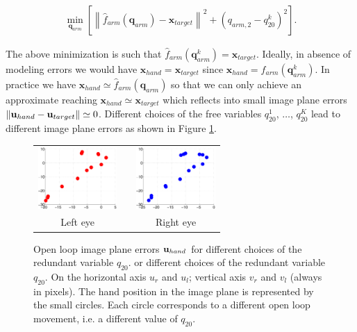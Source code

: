 {\footnotesize 
  \begin{eqnarray} \label{Eq:OpenLoopMovements}
	\min_{\mathbf q_{arm}}
	\left[
	  \left\| \hat f_{arm}(\mathbf q_{arm}) - \mathbf x_{target}\right\|^2 + \left(q_{arm,2}-q_{20}^k\right)^2
	  \right].
  \end{eqnarray}
}

 The above minimization is such that $\hat f_{arm}(\mathbf q_{arm}^k) = \mathbf x_{target}$. Ideally, in absence
 of modeling errors we would have $ \mathbf x_{hand} = \mathbf x_{target}$ since $\mathbf x_{hand} = f_{arm}(\mathbf q_{arm}^k)$. In practice we have $\mathbf x_{hand} \simeq \hat f_{arm}(\mathbf q_{arm})$ 
 so that we can only achieve an approximate reaching $ \mathbf x_{hand} \simeq \mathbf x_{target}$ 
 which reflects into small image plane errors $\| \mathbf{u}_{hand} - \mathbf{u}_{target}\| \simeq 0$. Different choices 
 of the free variables $q_{20}^1$, $\dots$, $q_{20}^K$ lead to different image plane errors as shown 
 in Figure \ref{Fig:ImagePlaneOpenLoopErrors}.



\begin{figure}
  \begin{center}
	\begin{tabular}{ccc}
	  \parbox{30mm}{\includegraphics[width=30mm]{Figure/LeftEyeOpenLoop.eps}}  & \hspace{0.1cm} &
	  \parbox{30mm}{\includegraphics[width=30mm]{Figure/RightEyeOpenLoop.eps}}
	  \\
	  \parbox{30mm}{\centering Left eye } & \hspace{0.1cm} & \parbox{30mm}{\centering Right eye }
  \end{tabular}
\end{center}
\caption{Open loop image plane errors $\mathbf{u}_{hand}$ for different
choices of the redundant variable $q_{20}$. or different
choices of the redundant variable $q_{20}$. On the horizontal axis 
$u_r$ and $u_l$; vertical axis $v_r$ and $v_l$ (always in pixels).
The hand position in the image plane is represented 
by the small circles.  Each circle corresponds to a different open loop movement, i.e. a different value of $q_{20}$.
}\label{Fig:ImagePlaneOpenLoopErrors}
 \end{figure}

